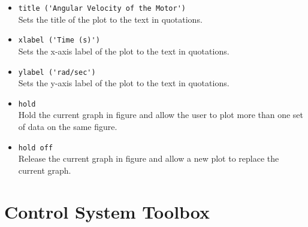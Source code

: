 \begin{itemize}
    \item \verb|title ('Angular Velocity of the Motor')|\\
          Sets the title of the plot to the text in quotations.

    \item \verb|xlabel ('Time (s)')|\\
          Sets the x-axis label of the plot to the text in quotations.

    \item \verb|ylabel ('rad/sec')|\\
          Sets the y-axis label of the plot to the text in quotations.

    \item \verb|hold|\\
          Hold the current graph in figure and allow the user to plot more than one set
          of data on the same figure.

    \item \verb|hold off|\\
          Release the current graph in figure and allow a new plot to replace the
          current graph.
\end{itemize}

\section{Control System Toolbox}

